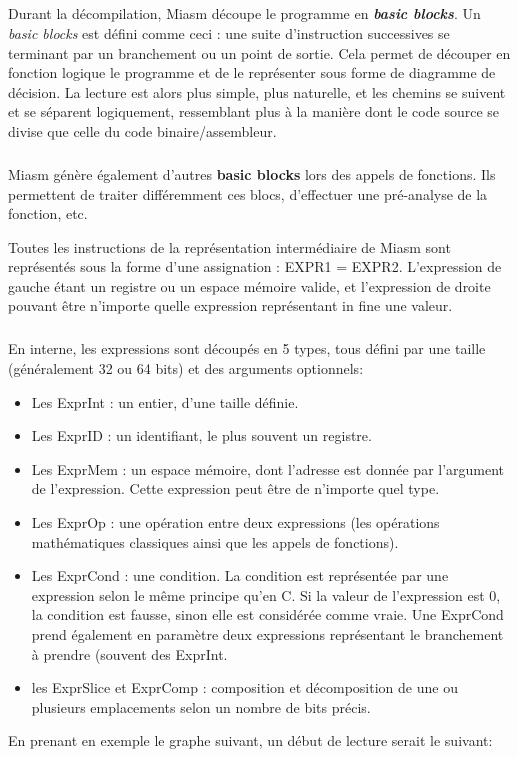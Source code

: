 \subparagraph{}
Durant la décompilation, Miasm découpe le programme en \textbf{\textit{basic blocks}}. Un \textit{basic blocks} est défini comme ceci :
une suite d'instruction successives se terminant par un branchement ou un point de sortie. Cela permet de découper en fonction logique
le programme et de le représenter sous forme de diagramme de décision. La lecture est alors plus simple, plus naturelle, et les chemins se suivent et se
séparent logiquement, ressemblant plus à la manière dont le code source se divise que celle du code binaire/assembleur.
\subparagraph{}
Miasm génère également d'autres \textbf{basic blocks} lors des appels de fonctions. Ils permettent de traiter différemment ces blocs, d'effectuer une pré-analyse
de la fonction, etc.

Toutes les instructions de la représentation intermédiaire de Miasm sont représentés sous la forme d'une assignation : EXPR1 = EXPR2.
L'expression de gauche étant un registre ou un espace mémoire valide, et l'expression de droite pouvant être n'importe quelle expression
représentant in fine une valeur.
\subparagraph{}
En interne, les expressions sont découpés en 5 types, tous défini par une taille (généralement 32 ou 64 bits) et des arguments optionnels:
\begin{itemize}
    \item Les ExprInt : un entier, d'une taille définie.
    \item Les ExprID : un identifiant, le plus souvent un registre.
    \item Les ExprMem : un espace mémoire, dont l'adresse est donnée par l'argument de l'expression. Cette expression peut être de n'importe quel type.
    \item Les ExprOp : une opération entre deux expressions (les opérations mathématiques classiques ainsi que les appels de fonctions).
    \item Les ExprCond : une condition. La condition est représentée par une expression selon le même principe qu'en C. Si la valeur de l'expression est 0, la condition est fausse,
sinon elle est considérée comme vraie. Une ExprCond prend également en paramètre deux expressions représentant le branchement à prendre (souvent des ExprInt.
    \item les ExprSlice et ExprComp : composition et décomposition de une ou plusieurs emplacements selon un nombre de bits précis.
\end{itemize}
En prenant en exemple le graphe suivant, un début de lecture serait le suivant:
